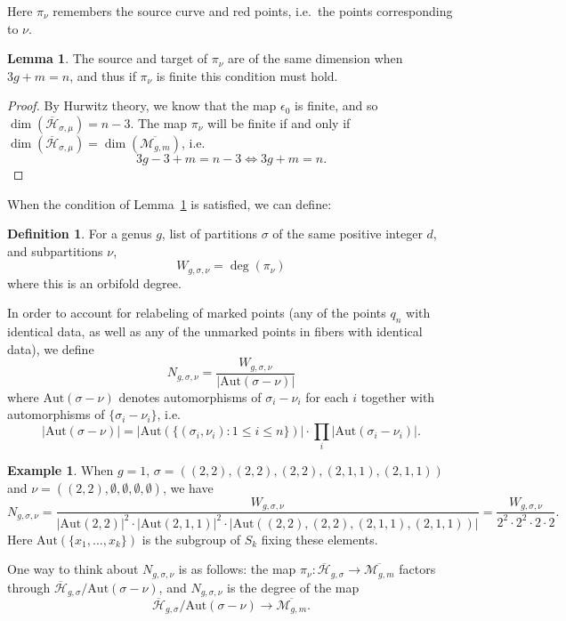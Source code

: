 \documentclass[11pt]{article}           %
\newcommand{\Aut}{\text{Aut}}
\newcommand{\Hb}{\overline{\mathcal H}}
\theoremstyle{definition}
\newtheorem{dfn}[thm]{Definition}
\newtheorem{lem}[thm]{Lemma}
\newtheorem{eg}[thm]{Example}
\begin{document}
Here $\pi_{\nu}$ remembers the source curve and red points, i.e.\ the points corresponding to $\nu$. 

\begin{lem}
  \label{lem:dim}
  The source and target of $\pi_{\nu}$ are of the same dimension when $3g+m=n$,
  and thus if $\pi_{\nu}$ is finite this condition must hold.
\end{lem}
\begin{proof}
  By Hurwitz theory, we know that the map $\epsilon_0$ is finite, and so $\dim(\Hb_{\sigma,\mu})=n-3$. The map $\pi_{\nu}$ will be finite if and only if
  $\dim(\Hb_{\sigma,\mu})=\dim(\overline{\mathcal M_{g,m}})$, i.e.
  \[
  3g-3+m=n-3\iff 3g+m=n.
  \]
  \end{proof}

When the condition of Lemma~\ref{lem:dim} is satisfied, we can define:
\begin{dfn}
  For a genus $g$, list of partitions $\sigma$ of the
  same positive integer $d$, and subpartitions $\nu$,
\[
W_{g,\sigma,\nu}=\deg(\pi_{\nu})
\]
where this is an orbifold degree.
\end{dfn}
In order to account for relabeling of marked points (any of the points $q_n$ with identical data, as well as any of the unmarked points in fibers with
identical data), we define
\[
N_{g,\sigma,\nu}=\frac{W_{g,\sigma,\nu}}{|\Aut(\sigma-\nu)|}
\]
where $\Aut(\sigma-\nu)$ denotes automorphisms of $\sigma_i-\nu_i$ for each $i$ together with automorphisms of $\{\sigma_i-\nu_i\}$, i.e.
\[
|\Aut(\sigma-\nu)|=|\Aut(\{(\sigma_i,\nu_i):1\leq i\leq n\})|\cdot \prod_i|\Aut(\sigma_i-\nu_i)|.
\]
\begin{eg}
  When $g=1$, $\sigma=((2,2),(2,2),(2,2),(2,1,1),(2,1,1))$ and $\nu=((2,2),\emptyset,\emptyset,\emptyset,\emptyset)$, we have
  \[
  N_{g,\sigma,\nu}=\frac{W_{g,\sigma,\nu}}{|\Aut(2,2)|^2\cdot |\Aut(2,1,1)|^2\cdot |\Aut((2,2),(2,2),(2,1,1),(2,1,1))|}=\frac{W_{g,\sigma,\nu}}{2^2\cdot 2^2\cdot 2\cdot 2}.
  \]
  Here $\Aut(\{x_1,\dots,x_k\})$ is the subgroup of $S_k$ fixing these elements.
  \end{eg}

One way to think about $N_{g,\sigma,\nu}$ is as follows: the map
$\pi_{\nu}:\Hb_{g,\sigma}\to\overline{\mathcal M_{g,m}}$ factors through
$\Hb_{g,\sigma}/\Aut(\sigma-\nu)$, and $N_{g,\sigma,\nu}$ is the degree of the map
\[
\Hb_{g,\sigma}/\Aut(\sigma-\nu)\to\overline{\mathcal M_{g,m}}.
\]
\end{document}
